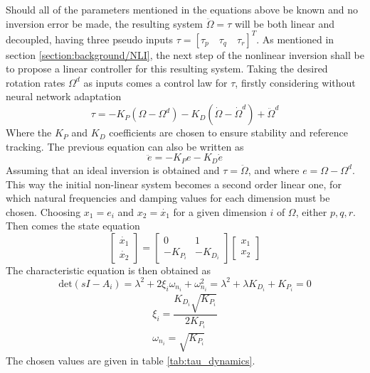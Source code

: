 Should all of the parameters mentioned in the equations above be known and no inversion error be made, the resulting system $\ddot{\Omega}=\tau$ will be both linear and decoupled, having three pseudo inputs $\tau = [\tau_p \quad \tau_q \quad \tau_r]^T$. As mentioned in section \ref{section:background/NLI}, the next step of the nonlinear inversion shall be to propose a linear controller for this resulting system. Taking the desired rotation rates $\Omega^d$ as inputs comes a control law for $\tau$, firstly considering without neural network adaptation
\begin{equation}
\tau = -K_P (\Omega-\Omega^d)-K_D (\dot{\Omega}-\dot{\Omega}^d)+\ddot{\Omega}^d
\label{eq:linear_controller}
\end{equation}
Where the $K_P$ and $K_D$ coefficients are chosen to ensure stability and reference tracking. The previous equation can also be written as
\begin{equation}
\ddot{e}=-K_P e - K_D \dot{e}
\end{equation}
Assuming that an ideal inversion is obtained and $\tau=\ddot{\Omega}$, and where $e=\Omega-\Omega^d$. This way the initial non-linear system becomes a second order linear one, for which natural frequencies and damping values for each dimension must be chosen. Choosing $x_1=e_i$ and $x_2=\dot{x_1}$ for a given dimension $i$ of $\Omega$, either $p,q,r$. Then comes the state equation
\begin{equation}
\begin{bmatrix}
\dot{x_1}\\
\dot{x_2}
\end{bmatrix}=
\begin{bmatrix}
0 & 1\\
-K_{P_i} & -K_{D_i}
\end{bmatrix}
\begin{bmatrix}
x_1\\
x_2
\end{bmatrix}
\end{equation}
The characteristic equation is then obtained as 
\begin{equation}
\text{det}(sI-A_i)= \lambda^2 + 2\xi_i \omega_{n_i} +  \omega_{n_i}^2 = \lambda^2 + \lambda K_{D_i} + K_{P_i} = 0
\end{equation}
\begin{gather}
\xi_i = \dfrac{K_{D_i}\sqrt{K_{P_i}}}{2K_{P_i}}\\
\omega_{n_i}=\sqrt{K_{P_i}}
\end{gather}
The chosen values are given in table \ref{tab:tau_dynamics}.

